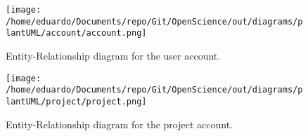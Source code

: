 \documentclass{article}
\begin{document}
    \begin{figure}[H]
        \centering
        \texttt{[image: /home/eduardo/Documents/repo/Git/OpenScience/out/diagrams/plantUML/account/account.png]}  %
        \caption{Entity-Relationship diagram for the user account.}
        \label{fig:er-diagram}
    \end{figure}

   
    \vspace{1cm}
    
    \begin{figure}[H]
        \centering
        \texttt{[image: /home/eduardo/Documents/repo/Git/OpenScience/out/diagrams/plantUML/project/project.png]}  %
        \caption{Entity-Relationship diagram for the project account.}
        \label{fig:er-diagram}
    \end{figure}
    
    
    
\end{document}
